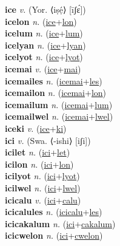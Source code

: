 \textbf{ice} \textit{v.} (Yor. ⟨iṣẹ́⟩ [īʃɛ́])
 \label{ice} \\
\textbf{icelon} \textit{n.} (\hyperref[ice]{ice}+\hyperref[lon]{lon})
 \label{icelon} \\
\textbf{icelum} \textit{n.} (\hyperref[ice]{ice}+\hyperref[lum]{lum})
 \label{icelum} \\
\textbf{icelyan} \textit{n.} (\hyperref[ice]{ice}+\hyperref[lyan]{lyan})
 \label{icelyan} \\
\textbf{icelyot} \textit{n.} (\hyperref[ice]{ice}+\hyperref[lyot]{lyot})
 \label{icelyot} \\
\textbf{icemai} \textit{v.} (\hyperref[ice]{ice}+\hyperref[mai]{mai})
 \label{icemai} \\
\textbf{icemailes} \textit{n.} (\hyperref[icemai]{icemai}+\hyperref[les]{les})
 \label{icemailes} \\
\textbf{icemailon} \textit{n.} (\hyperref[icemai]{icemai}+\hyperref[lon]{lon})
 \label{icemailon} \\
\textbf{icemailum} \textit{n.} (\hyperref[icemai]{icemai}+\hyperref[lum]{lum})
 \label{icemailum} \\
\textbf{icemailwel} \textit{n.} (\hyperref[icemai]{icemai}+\hyperref[lwel]{lwel})
 \label{icemailwel} \\
\textbf{iceki} \textit{v.} (\hyperref[ice]{ice}+\hyperref[ki]{ki})
 \label{iceki} \\
\textbf{ici} \textit{v.} (Swa. ⟨-ishi⟩ [iʃi])
 \label{ici} \\
\textbf{icilet} \textit{n.} (\hyperref[ici]{ici}+\hyperref[let]{let})
 \label{icilet} \\
\textbf{icilon} \textit{n.} (\hyperref[ici]{ici}+\hyperref[lon]{lon})
 \label{icilon} \\
\textbf{icilyot} \textit{n.} (\hyperref[ici]{ici}+\hyperref[lyot]{lyot})
 \label{icilyot} \\
\textbf{icilwel} \textit{n.} (\hyperref[ici]{ici}+\hyperref[lwel]{lwel})
 \label{icilwel} \\
\textbf{icicalu} \textit{v.} (\hyperref[ici]{ici}+\hyperref[calu]{calu})
 \label{icicalu} \\
\textbf{icicalules} \textit{n.} (\hyperref[icicalu]{icicalu}+\hyperref[les]{les})
 \label{icicalules} \\
\textbf{icicakalum} \textit{n.} (\hyperref[ici]{ici}+\hyperref[cakalum]{cakalum})
 \label{icicakalum} \\
\textbf{icicwelon} \textit{n.} (\hyperref[ici]{ici}+\hyperref[cwelon]{cwelon})
 \label{icicwelon} \\
